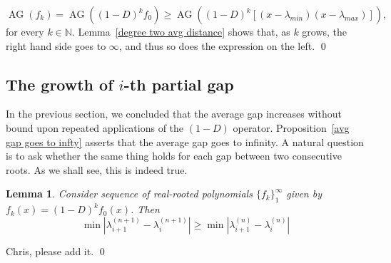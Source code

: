 \documentclass[11pt]{article}
\DeclareMathOperator{\AG}{AG}
\newtheorem{lemma}[theorem]{Lemma}
\begin{document}
\[\AG(f_k)= \AG((1-D)^kf_0)\geq\AG((1-D)^k [(x-\lambda_{min})(x-\lambda_{max})]),\]
for every $k\in\mathbb{N}$. Lemma~\ref{degree two avg distance} shows that, as $k$ grows, the right hand side goes to $\infty$, and thus so does the expression on the left. \qed

\subsection{The growth of $i$-th partial gap}
In the previous section, we concluded that the average gap increases without bound upon repeated applications of the $(1-D)$ operator. Proposition~\ref{avg gap goes to infty} asserts that the average gap goes to infinity. A natural question is to ask whether the same thing holds for each gap between two consecutive roots. As we shall see, this is indeed true.

\begin{lemma}
\label{minimal gap increases}
 Consider sequence of real-rooted polynomials $\{f_k\}_1^\infty$ given by $f_k(x) = (1-D)^k f_0(x)$. Then
 \[\min |\lambda^{(n+1)}_{i+1} - \lambda^{(n+1)}_i | \geq \min |\lambda^{(n)}_{i+1} - \lambda^{(n)}_i |\]
\end{lemma}
\proof Chris, please add it.
\qed

\begin{comment}
\begin{lemma}
Suppose $f_0(x)$ is a real-rooted polynomial with distinct roots $\lambda_1 < \lambda_2 < \cdots <\lambda_{n}$ such that $\lim_{m\to\infty} |\lambda_{i+1}[(1-D)^m f_0] - \lambda_{i}[(1-D)^m f_0]| =~\infty$ for every $ 1\leq i \leq n-1$. Suppose further $p_0(x)$ is a real polynomial having distinct roots $\mu_1 < \eta <\mu_2 < \cdots < \mu_{n-1},$ i.e., $p_0(x) = (x-\eta)f_0(x).$ Then we also have that
\[\lim_{n\to\infty} |\mu_{i+1}[(1-D)^m p_0] - \mu_{i}[(1-D)^m p_0]\big|=\infty,~\]
for every $1\leq i \leq n-1.$

\end{lemma}
\proof
We first show that
\[|\mu_{2}[(1-D)^m p_0] - \mu_{1}[(1-D)^m p_0]| \geq |\lambda_{2}[(1-D)^m f_0] - \lambda_{1}[(1-D)^m f_0]|,~\forall m\in\mathbb{N}.\]


Let $\varepsilon > 0$. Now since $\lim_{m\to\infty} |\lambda_{2}[(1-D)^m f_0] - \lambda_{1}[(1-D)^m f_0]| = \infty$, there exist $M\in\mathbb{N}$ such that $|\mu_{2}[(1-D)^m p_0] - \mu_{1}[(1-D)^m p_0]| \geq \frac{1}{\varepsilon},~\forall m\geq M$. Pick $\delta > 0$ The roots of $(1-D)^{m+1} p_0$ satisfy
\[\sum_1^n \frac{1}{x-\mu^{(m)}_i} < \varepsilon \]
\qed

\end{comment}
\end{document}
